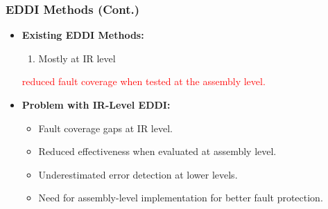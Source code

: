 \documentclass[
	12pt, %
]{beamer}
\begin{document}
\begin{frame}
	\frametitle{EDDI Methods (Cont.)}
	\begin{itemize}
		\item \textbf{Existing EDDI Methods:}
		\begin{enumerate}
			\item Mostly at IR level
		\end{enumerate}
		\textcolor{red}{reduced fault coverage when tested at the assembly level.}
		
		\item \textbf{Problem with IR-Level EDDI:}
		\begin{itemize}
			\item Fault coverage gaps at IR level.
			\item Reduced effectiveness when evaluated at assembly level.
			\item Underestimated error detection at lower levels.
			\item Need for assembly-level implementation for better fault protection.
		\end{itemize}
	\end{itemize}
\end{frame}
\end{document}
